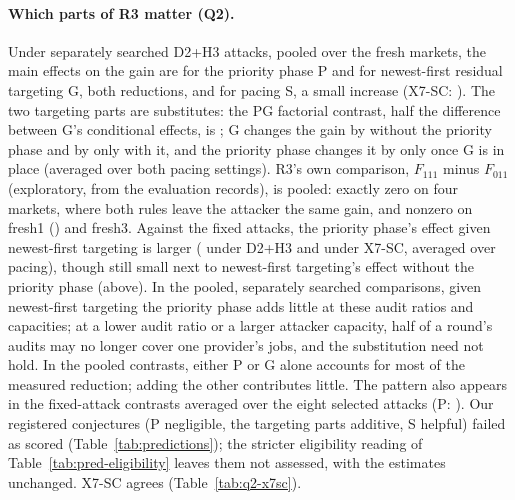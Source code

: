 \documentclass[11pt]{article}
\begin{document}
\paragraph{Which parts of R3 matter (Q2).} Under separately searched D2+H3 attacks, pooled over the fresh markets, the main effects on the gain are  for the priority phase P and  for newest-first residual targeting G, both reductions, and  for pacing S, a small increase (X7-SC: ). The two targeting parts are substitutes: the PG factorial contrast, half the difference between G's conditional effects, is ; G changes the gain by  without the priority phase and by only  with it, and the priority phase changes it by only  once G is in place (averaged over both pacing settings). R3's own comparison, $F_{111}$ minus $F_{011}$ (exploratory, from the evaluation records), is  pooled: exactly zero on four markets, where both rules leave the attacker the same gain, and nonzero on fresh1 () and fresh3. Against the fixed attacks, the priority phase's effect given newest-first targeting is larger ( under D2+H3 and  under X7-SC, averaged over pacing), though still small next to newest-first targeting's effect without the priority phase (above). In the pooled, separately searched comparisons, given newest-first targeting the priority phase adds little at these audit ratios and capacities; at a lower audit ratio or a larger attacker capacity, half of a round's audits may no longer cover one provider's jobs, and the substitution need not hold. In the pooled contrasts, either P or G alone accounts for most of the measured reduction; adding the other contributes little. The pattern also appears in the fixed-attack contrasts averaged over the eight selected attacks (P: ). Our registered conjectures (P negligible, the targeting parts additive, S helpful) failed as scored (Table~\ref{tab:predictions}); the stricter eligibility reading of Table~\ref{tab:pred-eligibility} leaves them not assessed, with the estimates unchanged. X7-SC agrees (Table~\ref{tab:q2-x7sc}).

\begin{table}[t]\centering\small
{}
\caption{Q2 under D2+H3: factorial contrasts, searched and fixed attacks, with attack and reference terms and efficiency (descriptive, nominal intervals).}\label{tab:q2}
\end{table}
\end{document}
